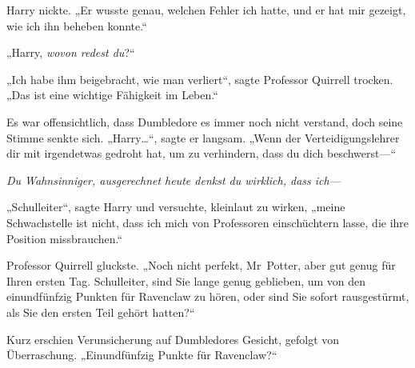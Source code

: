 Harry nickte. „Er wusste genau, welchen Fehler ich hatte, und er hat mir gezeigt, wie ich ihn beheben konnte.“

„Harry, \emph{wovon redest du}?“

„Ich habe ihm beigebracht, wie man verliert“, sagte Professor Quirrell trocken. „Das ist eine wichtige Fähigkeit im Leben.“

Es war offensichtlich, dass Dumbledore es immer noch nicht verstand, doch seine Stimme senkte sich. „Harry…“, sagte er langsam. „Wenn der Verteidigungslehrer dir mit irgendetwas gedroht hat, um zu verhindern, dass du dich beschwerst—“

\emph{Du Wahnsinniger, ausgerechnet heute denkst du wirklich, dass ich—}

„Schulleiter“, sagte Harry und versuchte, kleinlaut zu wirken, „meine Schwachstelle ist nicht, dass ich mich von Professoren einschüchtern lasse, die ihre Position missbrauchen.“

Professor Quirrell gluckste. „Noch nicht perfekt, Mr~Potter, aber gut genug für Ihren ersten Tag. Schulleiter, sind Sie lange genug geblieben, um von den einundfünfzig Punkten für Ravenclaw zu hören, oder sind Sie sofort rausgestürmt, als Sie den ersten Teil gehört hatten?“

Kurz erschien Verunsicherung auf Dumbledores Gesicht, gefolgt von Überraschung. „Einundfünfzig Punkte für Ravenclaw?“

